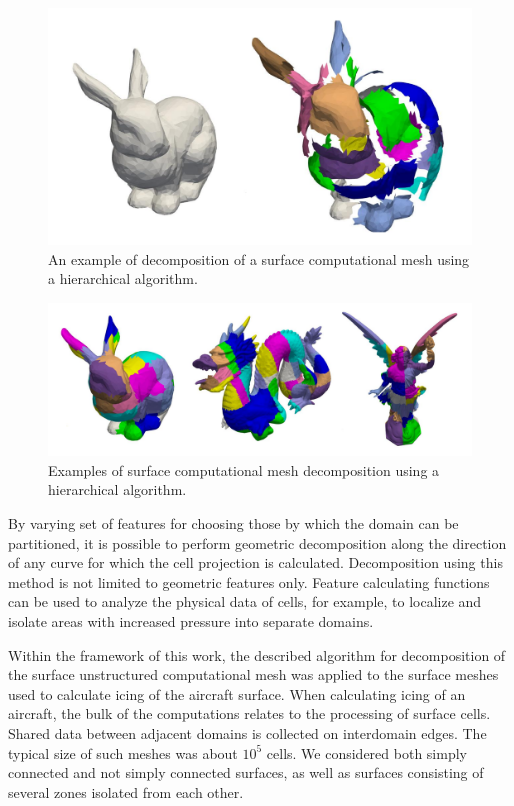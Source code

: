 \documentclass[
11pt,%
tightenlines,%
twoside,%
onecolumn,%
nofloats,%
nobibnotes,%
nofootinbib,%
superscriptaddress,%
noshowpacs,%
centertags]%
{revtex4}
\begin{document}
\begin{figure}[h]
\includegraphics[width=1.0\textwidth]{pics/03-explode-bunny.pdf}
\caption{An example of decomposition of a surface computational mesh using a hierarchical algorithm.}\label{fig:03-explode-bunny}
\end{figure}

\begin{figure}[h]
\includegraphics[width=1.0\textwidth]{pics/03-hierarch.pdf}
\caption{Examples of surface computational mesh decomposition using a hierarchical algorithm.}\label{fig:03-hierarch}
\end{figure}

By varying set of features for choosing those by which the domain can be partitioned, it is possible to perform geometric decomposition along the direction of any curve for which the cell projection is calculated.
Decomposition using this method is not limited to geometric features only.
Feature calculating functions can be used to analyze the physical data of cells, for example, to localize and isolate areas with increased pressure into separate domains.

Within the framework of this work, the described algorithm for decomposition of the surface unstructured computational mesh was applied to the surface meshes used to calculate icing of the aircraft surface.
When calculating icing of an aircraft, the bulk of the computations relates to the processing of surface cells.
Shared data between adjacent domains is collected on interdomain edges.
The typical size of such meshes was about $ 10^5 $ cells. We considered both simply connected and not simply connected surfaces, as well as surfaces consisting of several zones isolated from each other.
\end{document}
